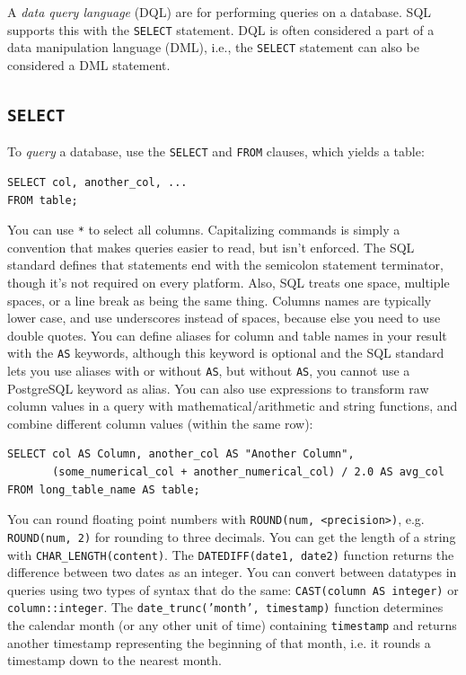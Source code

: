 \documentclass[table, xcdraw]{article}%
\begin{document}
A \emph{data query language} (DQL) are for performing queries on a database. SQL supports this with the \texttt{SELECT} statement. DQL is often considered a part of a data manipulation language (DML), i.e., the \texttt{SELECT} statement can also be considered a DML statement.

\subsection{\texttt{SELECT}}

To \emph{query} a database, use the \texttt{SELECT} and \texttt{FROM} clauses, which yields a table:

\begin{verbatim}
SELECT col, another_col, ...
FROM table;
\end{verbatim}

You can use \texttt{*} to select all columns. Capitalizing commands is simply a convention that makes queries easier to read, but isn't enforced. The SQL standard defines that statements end with the semicolon statement terminator, though it's not required on every platform. Also, SQL treats one space, multiple spaces, or a line break as being the same thing. Columns names are typically lower case, and use underscores instead of spaces, because else you need to use double quotes. You can define aliases for column and table names in your result with the \texttt{AS} keywords, although this keyword is optional and the SQL standard lets you use aliases with or without \texttt{AS}, but without \texttt{AS}, you cannot use a PostgreSQL keyword as alias. You can also use expressions to transform raw column values in a query with mathematical/arithmetic and string functions, and combine different column values (within the same row):

\begin{verbatim}
SELECT col AS Column, another_col AS "Another Column",
       (some_numerical_col + another_numerical_col) / 2.0 AS avg_col
FROM long_table_name AS table;
\end{verbatim}

You can round floating point numbers with \texttt{ROUND(num, <precision>)}, e.g. \texttt{ROUND(num, 2)} for rounding to three decimals. You can get the length of a string with \texttt{CHAR_LENGTH(content)}. The \texttt{DATEDIFF(date1, date2)} function returns the difference between two dates as an integer. You can convert between datatypes in queries using two types of syntax that do the same: \texttt{CAST(column AS integer)} or \texttt{column::integer}. The \texttt{date_trunc('month', timestamp)} function determines the calendar month (or any other unit of time) containing \texttt{timestamp} and returns another timestamp representing the beginning of that month, i.e. it rounds a timestamp down to the nearest month.
\end{document}

